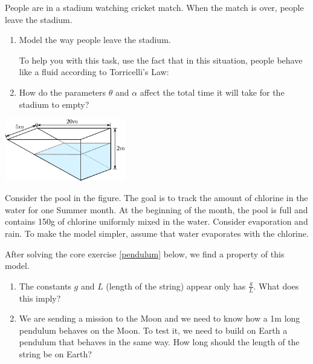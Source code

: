 \begin{exercises}
\begin{problist}
	\prob People are in a stadium watching cricket match. When the match is over, people leave the stadium. 
	
	\begin{enumerate}
	\item Model the way people leave the stadium.
	
	To help you with this task, use the fact that in this situation, people behave like a fluid according to Torricelli's Law:
	
		\begin{center}
		\end{center}

	\item How do the parameters $\theta$ and $\alpha$ affect the total time it will take for the stadium to empty?
	\end{enumerate}
	
	\begin{center}
		\includegraphics*[width=150pt]{images/module11-pool.pdf}
	\end{center}
	
	
	\prob Consider the pool in the figure. The goal is to track the amount of chlorine in the water for one Summer month. At the beginning of the month, the pool is full and contains 150g of chlorine uniformly mixed in the water. Consider evaporation and rain. To make the model simpler, assume that water evaporates with the chlorine.
	
	
	
	\prob After solving the core exercise \ref{pendulum} below, we find a property of this model. 
	\begin{enumerate}
		\item The constants $g$ and $L$ (length of the string) appear only has $\frac{g}{L}$. What does this imply?
		\item We are sending a mission to the Moon and we need to know how a 1m long pendulum behaves on the Moon. To test it, we need to build on Earth a pendulum that behaves in the same way. How long should the length of the string be on Earth?
	\end{enumerate}
	


\end{problist}
\end{exercises}
